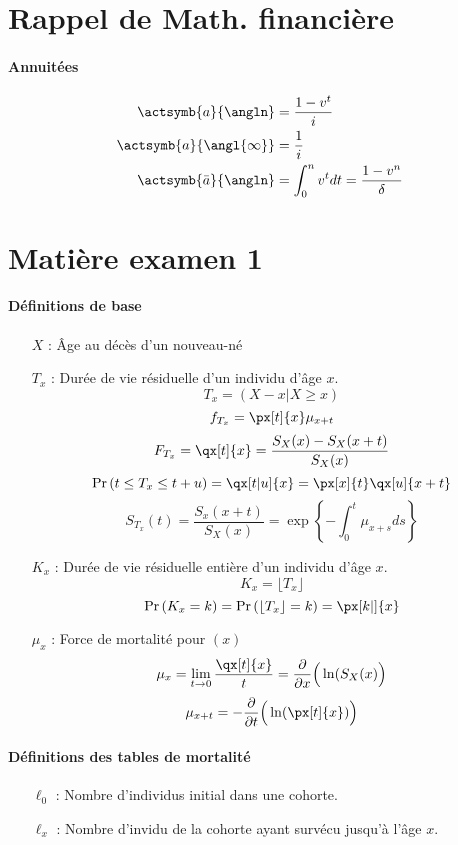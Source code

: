 \documentclass[10pt, french]{article}
\begin{document}
\footnotesize %
\begin{multicols*}{3} %
\section*{Rappel de Math. financière}
\paragraph{Annuitées}
\begin{align*}
	\actsymb{a}{\angln} &= \frac{1 - v^t}{i} \\
	\actsymb{a}{\angl{\infty}} &= \frac{1}{i} \\
	\actsymb{\bar{a}}{\angln} &= \int_0^n v^t dt = \frac{1 - v^n}{\delta}
\end{align*}

\section{Matière examen 1}
\paragraph{Définitions de base}
\begin{itemize}
\item[$X$ : ] Âge au décès d'un nouveau-né
\item[$T_x$ : ] Durée de vie résiduelle d'un individu d'âge $x$.
\[T_x = (X-x | X \geq x) \]
\[ f_{T_x} = \px[t]{x} \mu_{x+t} \]
\[ F_{T_x}   =\qx[t]{x} = \frac{S_X(x) - S_X(x+t)}{S_X(x)}  \]
\[ \prob{t \leq T_x \leq t+u} = \qx[t|u]{x} = \px[x]{t} \qx[u]{x+t} \]
\[S_{T_x}(t) = \frac{S_x(x+t)}{S_X(x)} = \exp \left\{ - \int_{0}^{t} \mu_{x+s} ds \right\}  \]
\item[$K_x$ : ] Durée de vie résiduelle entière d'un individu d'âge $x$.
\[K_x = \lfloor T_x \rfloor \]
\[\prob{K_x = k} = \prob{\lfloor T_x \rfloor = k} = \px[k|]{x} \]

\item[$\mu_x$ : ] Force de mortalité pour $(x)$
\[\mu_x = \lim_{t \to 0} \frac{\qx[t]{x}}{t} = \derivee{x} \Big( \ln(S_X(x)\Big) \]
\[\mu_{x+t} = - \derivee{t} \Big( \ln ( \px[t]{x}) \Big) \]
\end{itemize}

\paragraph{Définitions des tables de mortalité}
\begin{itemize}
\item[$\ell_0$ : ] Nombre d'individus initial dans une cohorte.
\item[$\ell_x$ : ] Nombre d'invidu de la cohorte ayant survécu jusqu'à l'âge $x$.


\end{itemize}
\end{multicols*}
\end{document}
